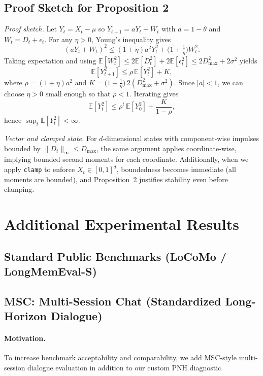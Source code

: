\documentclass{article}
\begin{document}
\subsection{Proof Sketch for Proposition 2}
\textit{Proof sketch.} Let $Y_t=X_t-\mu$ so $Y_{t+1}=aY_t + W_t$ with $a=1-\theta$ and $W_t=D_t+\epsilon_t$. For any $\eta>0$, Young's inequality gives
\begin{equation}
(aY_t+W_t)^2 \le (1+\eta)a^2 Y_t^2 + \Big(1+\tfrac{1}{\eta}\Big) W_t^2.
\end{equation}
Taking expectation and using $\mathbb{E}[W_t^2]\le 2\mathbb{E}[D_t^2]+2\mathbb{E}[\epsilon_t^2]\le 2D_{\max}^2+2\sigma^2$ yields
\begin{equation}
\mathbb{E}[Y_{t+1}^2] \le \rho\,\mathbb{E}[Y_t^2] + K,
\end{equation}
where $\rho=(1+\eta)a^2$ and $K=\big(1+\tfrac{1}{\eta}\big)\,2(D_{\max}^2+\sigma^2)$. Since $|a|<1$, we can choose $\eta>0$ small enough so that $\rho<1$. Iterating gives
\begin{equation}
\mathbb{E}[Y_t^2] \le \rho^t\,\mathbb{E}[Y_0^2] + \frac{K}{1-\rho},
\end{equation}
hence $\sup_t \mathbb{E}[Y_t^2] < \infty$.

\textit{Vector and clamped state.} For $d$-dimensional states with component-wise impulses bounded by $\|D_t\|_\infty\le D_{\max}$, the same argument applies coordinate-wise, implying bounded second moments for each coordinate. Additionally, when we apply \texttt{clamp} to enforce $X_t\in[0,1]^d$, boundedness becomes immediate (all moments are bounded), and Proposition~2 justifies stability even before clamping.

\section{Additional Experimental Results}
\label{app:additional-results}

\subsection{Standard Public Benchmarks (LoCoMo / LongMemEval-S)}

\subsection{MSC: Multi-Session Chat (Standardized Long-Horizon Dialogue)}
\label{app:msc}
\paragraph{Motivation.}
To increase benchmark acceptability and comparability, we add MSC-style multi-session dialogue evaluation in addition to our custom PNH diagnostic.
\end{document}
